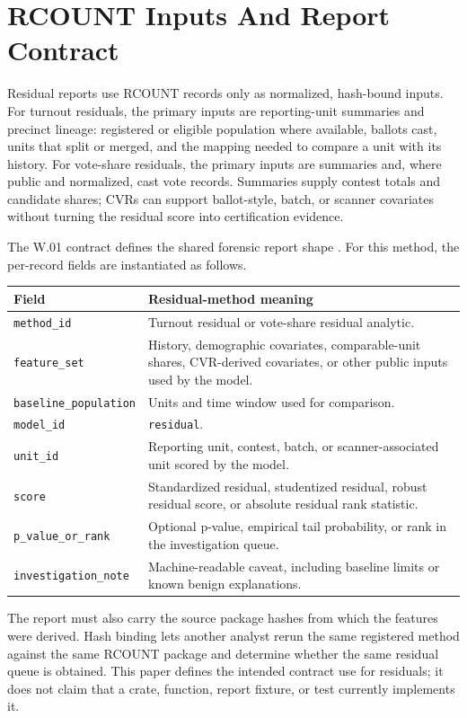 \section{RCOUNT Inputs And Report Contract}

Residual reports use RCOUNT records only as normalized, hash-bound inputs. For
turnout residuals, the primary inputs are reporting-unit summaries and precinct
lineage: registered or eligible population where available, ballots cast, units
that split or merged, and the mapping needed to compare a unit with its history.
For vote-share residuals, the primary inputs are summaries and, where public and
normalized, cast vote records. Summaries supply contest totals and candidate
shares; CVRs can support ballot-style, batch, or scanner covariates without
turning the residual score into certification evidence.

The W.01 contract defines the shared forensic report shape
\citep{wseries-overview-2026}. For this method, the per-record fields are
instantiated as follows.

\begin{center}
\small
\begin{tabularx}{\textwidth}{lX}
\toprule
Field & Residual-method meaning \\
\midrule
\texttt{method\_id} & Turnout residual or vote-share residual analytic. \\
\texttt{feature\_set} & History, demographic covariates, comparable-unit shares, CVR-derived covariates, or other public inputs used by the model. \\
\texttt{baseline\_population} & Units and time window used for comparison. \\
\texttt{model\_id} & \texttt{residual}. \\
\texttt{unit\_id} & Reporting unit, contest, batch, or scanner-associated unit scored by the model. \\
\texttt{score} & Standardized residual, studentized residual, robust residual score, or absolute residual rank statistic. \\
\texttt{p\_value\_or\_rank} & Optional p-value, empirical tail probability, or rank in the investigation queue. \\
\texttt{investigation\_note} & Machine-readable caveat, including baseline limits or known benign explanations. \\
\bottomrule
\end{tabularx}
\end{center}

The report must also carry the source package hashes from which the features
were derived. Hash binding lets another analyst rerun the same registered method
against the same RCOUNT package and determine whether the same residual queue is
obtained. This paper defines the intended contract use for residuals; it does
not claim that a crate, function, report fixture, or test currently implements
it.
